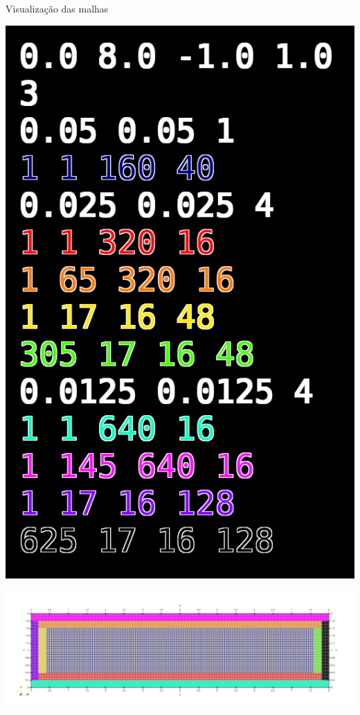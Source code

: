 \documentclass[../main/main.tex]{subfiles}
\begin{document}
\begin{frame}{Visualização das malhas}
    \begin{center}
        \begin{minipage}{0.20\textwidth}
            \includegraphics[width=\textwidth]{imgs/ref3_PorPartes_amrColors.png}
        \end{minipage}
        \hfill
        \begin{minipage}{0.75\textwidth}
            \includegraphics[width=\textwidth]{imgs/ref3_PorPartes.png}


\end{minipage}
\end{center}
\end{frame}
\end{document}
